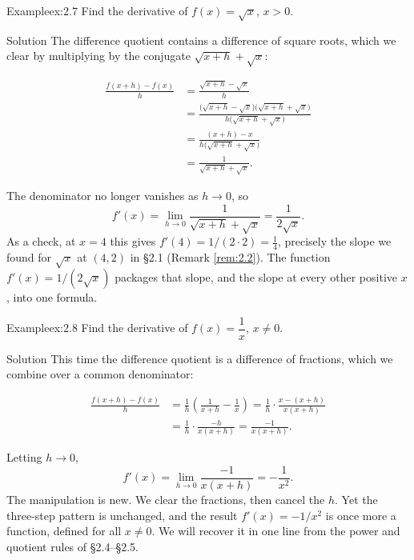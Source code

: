 \documentclass[a4paper,12pt,oneside]{memoir}
\begin{document}
\begin{workedexample}
\begin{envexample}{Example}{ex:2.7}{}
Find the derivative of \(f(x) = \sqrt{x}\), \(x > 0\).
\end{envexample}
\begin{envsolution}{Solution}{}{}
The difference quotient contains a difference of square roots, which we clear by multiplying by the conjugate \(\sqrt{x + h} + \sqrt{x}\):

\[ \begin{aligned}
          \frac{f(x + h) - f(x)}{h}
            &= \frac{\sqrt{x + h} - \sqrt{x}}{h} \\[4pt]
            &= \frac{\bigl(\sqrt{x + h} - \sqrt{x}\bigr)\bigl(\sqrt{x + h} + \sqrt{x}\bigr)}{h\bigl(\sqrt{x + h} + \sqrt{x}\bigr)} \\[4pt]
            &= \frac{(x + h) - x}{h\bigl(\sqrt{x + h} + \sqrt{x}\bigr)} \\[4pt]
            &= \frac{1}{\sqrt{x + h} + \sqrt{x}}.
        \end{aligned} \]

The denominator no longer vanishes as \(h \to 0\), so \[ f'(x) = \lim_{h \to 0} \frac{1}{\sqrt{x + h} + \sqrt{x}} = \frac{1}{2\sqrt{x}}. \] As a check, at \(x = 4\) this gives \(f'(4) = 1/(2 \cdot 2) = \tfrac{1}{4}\), precisely the slope we found for \(\sqrt{x}\) at \((4, 2)\) in §2.1 (Remark \ref{rem:2.2}). The function \(f'(x) = 1/(2\sqrt{x})\) packages that slope, and the slope at every other positive \(x\), into one formula.
\end{envsolution}
\end{workedexample}
\begin{workedexample}
\begin{envexample}{Example}{ex:2.8}{}
Find the derivative of \(f(x) = \dfrac{1}{x}\), \(x \ne 0\).
\end{envexample}
\begin{envsolution}{Solution}{}{}
This time the difference quotient is a difference of fractions, which we combine over a common denominator:

\[ \begin{aligned}
          \frac{f(x + h) - f(x)}{h}
            &= \frac{1}{h}\left( \frac{1}{x + h} - \frac{1}{x} \right)
             = \frac{1}{h} \cdot \frac{x - (x + h)}{x(x + h)} \\[4pt]
            &= \frac{1}{h} \cdot \frac{-h}{x(x + h)}
             = \frac{-1}{x(x + h)}.
        \end{aligned} \]

Letting \(h \to 0\), \[ f'(x) = \lim_{h \to 0} \frac{-1}{x(x + h)} = -\frac{1}{x^{2}}. \] The manipulation is new. We clear the fractions, then cancel the \(h\). Yet the three-step pattern is unchanged, and the result \(f'(x) = -1/x^{2}\) is once more a function, defined for all \(x \ne 0\). We will recover it in one line from the power and quotient rules of §2.4–§2.5.
\end{envsolution}
\end{workedexample}
\end{document}

